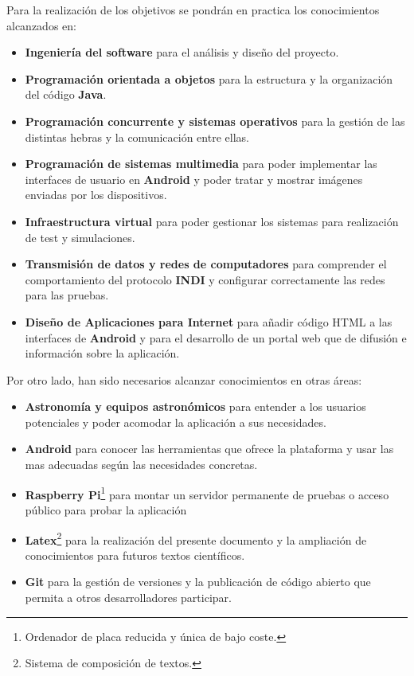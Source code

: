 \bigskip
Para la realización de los objetivos se pondrán en practica los conocimientos alcanzados en:

\begin{itemize}
  \item \textbf{Ingeniería del software} para el análisis y diseño del proyecto.
  \item \textbf{Programación orientada a objetos} para la estructura y la organización del código \textbf{Java}.
  \item \textbf{Programación concurrente y sistemas operativos} para la gestión de las distintas hebras y la comunicación entre ellas.
  \item \textbf{Programación de sistemas multimedia} para poder implementar las interfaces de usuario en \textbf{Android} y poder tratar y mostrar imágenes enviadas por los dispositivos.
  \item \textbf{Infraestructura virtual} para poder gestionar los sistemas para realización de test y simulaciones.
  \item \textbf{Transmisión de datos y redes de computadores} para comprender el comportamiento del protocolo \textbf{INDI} y configurar correctamente las redes para las pruebas.
  \item \textbf{Diseño de Aplicaciones para Internet} para añadir código HTML a las interfaces de \textbf{Android} y para el desarrollo de un portal web que de difusión e información sobre la aplicación.
\end{itemize}

\bigskip
Por otro lado, han sido necesarios alcanzar conocimientos en otras áreas:

\begin{itemize}
  \item \textbf{Astronomía y equipos astronómicos} para entender a los usuarios potenciales y poder acomodar la aplicación a sus necesidades.
  \item \textbf{Android} para conocer las herramientas que ofrece la plataforma y usar las mas adecuadas según las necesidades concretas.
  \item \textbf{Raspberry Pi}\footnote{Ordenador de placa reducida y única de bajo coste.} para montar un servidor permanente de pruebas o acceso público para probar la aplicación
  \item \textbf{Latex}\footnote{Sistema de composición de textos.} para la realización del presente documento y la ampliación de conocimientos para futuros textos científicos.
  \item \textbf{Git} para la gestión de versiones y la publicación de código abierto que permita a otros desarrolladores participar.
\end{itemize}


